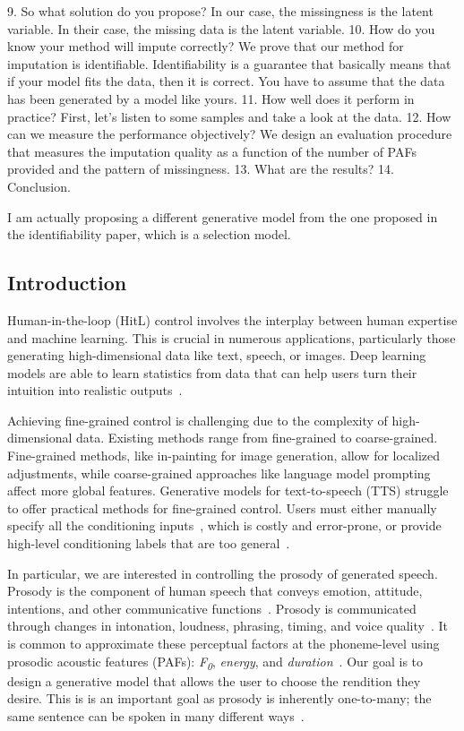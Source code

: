 \documentclass[a4paper,12pt,twoside,openright]{report}
\newcommand{\fzero}{F\textsubscript{0}}
\begin{document}
9. So what solution do you propose? In our case, the missingness is the latent variable. In their case, the missing data is the latent variable.
10. How do you know your method will impute correctly? We prove that our method for imputation is identifiable. Identifiability is a guarantee that basically means that if your model fits the data, then it is correct. You have to assume that the data has been generated by a model like yours.
11. How well does it perform in practice? First, let's listen to some samples and take a look at the data.
12. How can we measure the performance objectively? We design an evaluation procedure that measures the imputation quality as a function of the number of PAFs provided and the pattern of missingness.
13. What are the results?
14. Conclusion.

I am actually proposing a different generative model from the one proposed in the identifiability paper, which is a selection model.

\subsection{Introduction}
\label{intro}

Human-in-the-loop (HitL) control involves the interplay between human expertise and machine learning. This is crucial in numerous applications, particularly those generating high-dimensional data like text, speech, or images. Deep learning models are able to learn statistics from data that can help users turn their intuition into realistic outputs~\parencite{wu2022survey}.

Achieving fine-grained control is challenging due to the complexity of high-dimensional data. Existing methods range from fine-grained to coarse-grained. Fine-grained methods, like in-painting for image generation, allow for localized adjustments, while coarse-grained approaches like language model prompting affect more global features. Generative models for text-to-speech (TTS) struggle to offer practical methods for fine-grained control. Users must either manually specify all the conditioning inputs~\parencite{Lee2018RobustAF, vetterli}, which is costly and error-prone, or provide high-level conditioning labels that are too general~\parencite{Ramesh2022HierarchicalTI}.

In particular, we are interested in controlling the prosody of generated speech. Prosody is the component of human speech that conveys emotion, attitude, intentions, and other communicative functions~\parencite[Chapter~2]{zack-PhD-thesis:2022}. Prosody is communicated through changes in intonation, loudness, phrasing, timing, and voice quality~\parencite{prosody-review:2010}. It is common to approximate these perceptual factors at the phoneme-level using prosodic acoustic features (PAFs): \textit{\fzero}, \textit{energy}, and \textit{duration}~\parencite{PaperCup-Ctrl-P:2021}. Our goal is to design a generative model that allows the user to choose the rendition they desire. This is is an important goal as prosody is inherently one-to-many; the same sentence can be spoken in many different ways~\parencite{prosody-review:2010}.
\end{document}
